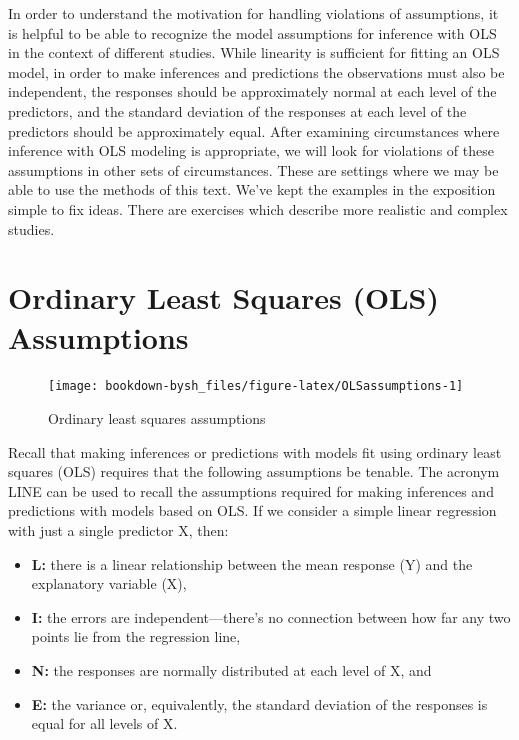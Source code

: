 \documentclass[
]{krantz}
\providecommand{\tightlist}{%
  \setlength{\itemsep}{0pt}\setlength{\parskip}{0pt}}
\begin{document}
In order to understand the motivation for handling violations of assumptions, it is helpful to be able to recognize the model assumptions for inference with OLS in the context of different studies. While linearity is sufficient for fitting an OLS model, in order to make inferences and predictions the observations must also be independent, the responses should be approximately normal at each level of the predictors, and the standard deviation of the responses at each level of the predictors should be approximately equal. After examining circumstances where inference with OLS modeling is appropriate, we will look for violations of these assumptions in other sets of circumstances. These are settings where we may be able to use the methods of this text. We've kept the examples in the exposition simple to fix ideas. There are exercises which describe more realistic and complex studies.

\hypertarget{ordinary-least-squares-ols-assumptions}{%
\section{Ordinary Least Squares (OLS) Assumptions}\label{ordinary-least-squares-ols-assumptions}}

\begin{figure}

{\centering \texttt{[image: bookdown-bysh\_files/figure-latex/OLSassumptions-1]} 

}

\caption{Ordinary least squares assumptions}\label{fig:OLSassumptions}
\end{figure}

Recall that making inferences or predictions with models fit using ordinary least squares (OLS) requires that the following assumptions be tenable. The acronym LINE can be used to recall the assumptions required for making inferences and predictions with models based on OLS. If we consider a simple linear regression with just a single predictor X, then:

\begin{itemize}
\tightlist
\item
  \textbf{L:} there is a linear relationship between the mean response (Y) and the explanatory variable (X),
\item
  \textbf{I:} the errors are independent---there's no connection between how far any two points lie from the regression line,
\item
  \textbf{N:} the responses are normally distributed at each level of X, and
\item
  \textbf{E:} the variance or, equivalently, the standard deviation of the responses is equal for all levels of X.
\end{itemize}
\end{document}
